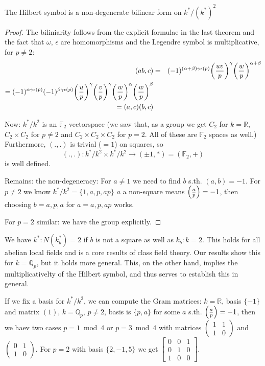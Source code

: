 \begin{theorem}
  The Hilbert symbol is a non-degenerate bilinear form on $k^*/(k^*)^2$
\end{theorem}
\begin{proof}
  The biliniarity follows from the explicit formulae in the last theorem
  and the fact that $\omega$, $\epsilon$ are homomorphisms and the Legendre
  symbol is multiplicative, for $p\ne 2$:
  \begin{eqnarray*}
    (ab, c) &=& (-1)^{(\alpha + \beta)\gamma\epsilon(p)} 
       {\left(\frac{uv}{p}\right)}^\gamma {\left(\frac{w}{p}\right)}^{\alpha + \beta} \\
       = (-1)^{\alpha\gamma\epsilon(p)} (-1)^{\beta\gamma\epsilon(p)} 
         {\left(\frac{u}{p}\right)}^\gamma {\left(\frac{v}{p}\right)}^\gamma {\left(\frac{w}{p}\right)}^\alpha
         {\left(\frac{w}{p}\right)}^\beta\\
       = (a, c)(b, c)  
  \end{eqnarray*}

  Now: $k^*/k^2$ is an $\mathbb F_2$ vectorspace (we saw that, as a group
  we get $C_2$ for $k=\mathbb R$, $C_2\times C_2$ for $p\ne 2$ and $C_2\times C_2\times C_2$ for $p=2$. All of these are $\mathbb F_2$ spaces as well.)
  Furthermore, $(.,.)$ is trivial ($=1$) on squares, so 
  $$(.,.): k^*/k^2 \times k^*/k^2\to(\pm1, *) = (\mathbb F_2, +)$$
  is well defined.

  Remains: the non-degeneracy:
  For $a\ne 1$ we need to find $b$ s.th. $(a,b)=-1$.
  For $p\ne 2$ we know $k^*/k^2 = \{1, a, p, ap\}$ $a$ a non-square means
  $\left(\frac{a}{p}\right) = -1$, then choosing $b = a, p, a$ for $a=a, p, ap$
  works.

  For $p=2$ similar: we have the group explicitly.
\end{proof}

\begin{remark}
  We have 
  $k^* : N(k_b^*) = 2$ if $b$ is not a square as well as
  $k_b:k = 2$. This holds for all abelian local fields and is a core results
  of class field theory. Our results show this for $k=\mathbb Q_p$,
  but it holds more general. This, on the other hand, implies the
  multiplicativelty of the Hilbert symbol, and thus serves to establish
  this in general.
\end{remark}

\begin{remark}
  If we fix a basis for $k^*/k^2$, we can compute the Gram matrices:
  $k = \mathbb R$, basis $\{-1\}$ and matrix $(1)$,
  $k=\mathbb Q_p$, $p\ne 2$, basis is $\{p, a\}$ for some $a$ s.th. $\left(\frac{a}{p}\right) = -1$, then we haev two cases $p=1\bmod 4$ or $p=3\bmod 4$ with matrices
  $\begin{pmatrix} 1 & 1\\ 1 & 0\end{pmatrix}$ and
  $\begin{pmatrix} 0 & 1\\ 1 & 0\end{pmatrix}$.
      For $p=2$ with basis $\{2, -1, 5\}$ we get
      $\begin{bmatrix} 0&0&1\\0&1&0\\1&0&0\end{bmatrix}$.
\end{remark}

